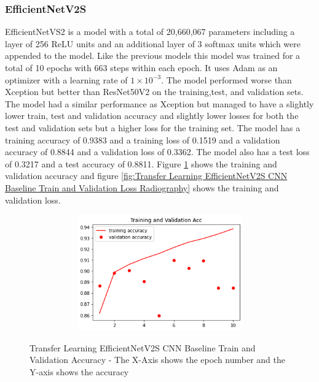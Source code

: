 \subsubsection{EfficientNetV2S}
EfficientNetVS2 is a model with a total of 20,660,067 parameters including a layer of 256 ReLU units and an additional layer of 3 softmax units which were appended to the model.  Like the previous models this model was trained for a total of 10 epochs with 663 steps within each epoch.  It uses Adam as an optimizer with a learning rate of $1\times10^{-3}$.  The model performed worse than Xception but better than ResNet50V2 on the training,test, and validation sets. The model had a similar performance as Xception but managed to have a slightly lower train, test and validation accuracy and slightly lower losses for both the test and validation sets but a higher loss for the training set.  The model has a training accuracy of 0.9383 and a training loss of 0.1519 and a validation accuracy of 0.8844 and a validation loss of 0.3362.  The model also has a test loss of 0.3217 and a test accuracy of 0.8811. Figure \ref{fig:Transfer Learning EfficientNetV2S CNN Baseline Train and Validation Accuracy Radiography} shows the training and validation accuracy and figure \ref{fig:Transfer Learning EfficientNetV2S CNN Baseline Train and Validation Loss Radiography} shows the training and validation loss. 
 \begin{figure}[H]
    \centering
    \includegraphics[width=1\textwidth,height=5cm,keepaspectratio]{Images/EfficientNetV2SBaselineTrainingValidationAccRadiography.png}\\
    \caption{Transfer Learning EfficientNetV2S CNN Baseline Train and Validation Accuracy  - The X-Axis shows the epoch number and the Y-axis shows the accuracy}
    \label{fig:Transfer Learning EfficientNetV2S CNN Baseline Train and Validation Accuracy Radiography}
\end{figure}
